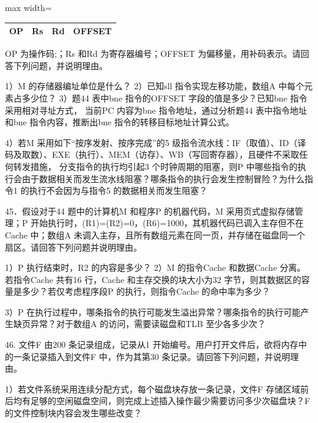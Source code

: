 \documentclass[UTF8,11pt]{ctexart}
\begin{document}
\begin{center}\begin{adjustbox}{max width=\linewidth}\begin{tabular}{|>{\raggedright\arraybackslash}p{\dimexpr(\linewidth-8\tabcolsep-5\arrayrulewidth)/4\relax}|>{\raggedright\arraybackslash}p{\dimexpr(\linewidth-8\tabcolsep-5\arrayrulewidth)/4\relax}|>{\raggedright\arraybackslash}p{\dimexpr(\linewidth-8\tabcolsep-5\arrayrulewidth)/4\relax}|>{\raggedright\arraybackslash}p{\dimexpr(\linewidth-8\tabcolsep-5\arrayrulewidth)/4\relax}|}\hline
OP & Rs & Rd & OFFSET\\\hline\end{tabular}\end{adjustbox}\end{center}

OP 为操作码;；Rs 和Rd 为寄存器编号；OFFSET 为偏移量，用补码表示。请回答下列问题，并说明理由。


1）M 的存储器编址单位是什么？ 2）已知sll 指令实现左移功能，数组A 中每个元素占多少位？ 3）题44 表中bne 指令的OFFSET 字段的值是多少？已知bne 指令采用相对寻址方式， 当前PC 内容为bne 指令地址，通过分析题44 表中指令地址和bne 指令内容，推断出bne 指令的转移目标地址计算公式。


4）若M 采用如下“按序发射、按序完成”的5 级指令流水线：IF（取值）、ID（译码及取数）、EXE（执行）、MEM（访存）、WB（写回寄存器），且硬件不采取任何转发措施， 分支指令的执行均引起3 个时钟周期的阻塞，则P 中哪些指令的执行会由于数据相关而发生流水线阻塞？哪条指令的执行会发生控制冒险？为什么指令1 的执行不会因为与指令5 的数据相关而发生阻塞？


45．假设对于44 题中的计算机M 和程序P 的机器代码，M 采用页式虚拟存储管理；P 开始执行时，(R1)=(R2)=0，(R6)=1000，其机器代码已调入主存但不在Cache 中；数组A 未调入主存，且所有数组元素在同一页，并存储在磁盘同一个扇区。请回答下列问题并说明理由。


1）P 执行结束时，R2 的内容是多少？ 2）M 的指令Cache 和数据Cache 分离。若指令Cache 共有16 行，Cache 和主存交换的块大小为32 字节，则其数据区的容量是多少？若仅考虑程序段P 的执行，则指令Cache 的命中率为多少？


3）P 在执行过程中，哪条指令的执行可能发生溢出异常？哪条指令的执行可能产生缺页异常？对于数组A 的访问，需要读磁盘和TLB 至少各多少次？


46. 文件F 由200 条记录组成，记录从1 开始编号。用户打开文件后，欲将内存中的一条记录插入到文件F 中，作为其第30 条记录。请回答下列问题，并说明理由。


1）若文件系统采用连续分配方式，每个磁盘块存放一条记录，文件F 存储区域前后均有足够的空闲磁盘空间，则完成上述插入操作最少需要访问多少次磁盘块？F 的文件控制块内容会发生哪些改变？
\end{document}
